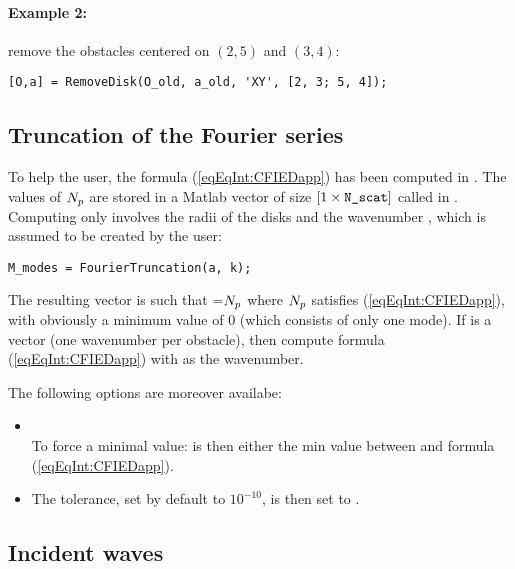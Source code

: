 \paragraph{Example 2:} remove the obstacles centered on $(2,5)$ and $(3,4)$:
\begin{verbatim}
[O,a] = RemoveDisk(O_old, a_old, 'XY', [2, 3; 5, 4]);
\end{verbatim}

\subsection{Truncation of the Fourier series}

To help the user, the formula (\ref{eqEqInt:CFIEDapp}) has been computed in \mudiff. The values of $N_{p}$ are stored in a Matlab vector of size $[1\times\texttt{N\_scat}]$ called  in \mudiff. Computing  only involves the radii of the disks and the wavenumber , which is assumed to be created by the user:
\begin{verbatim}
M_modes = FourierTruncation(a, k);
\end{verbatim}
The resulting vector is such that =$N_{p}$ where $N_{p}$ satisfies (\ref{eqEqInt:CFIEDapp}), with obviously a minimum value of $0$ (which consists of only one mode). If  is a vector (one wavenumber per obstacle), then  compute formula (\ref{eqEqInt:CFIEDapp})  with  as the wavenumber.

The following options are moreover availabe:
\begin{itemize}
\item {}\\
To force a minimal value:  is then either the min value between  and formula (\ref{eqEqInt:CFIEDapp}). 
\item{}
The tolerance, set by default to $10^{-10}$, is then set to .
\end{itemize}

\subsection{Incident waves}

\subsubsection{}

